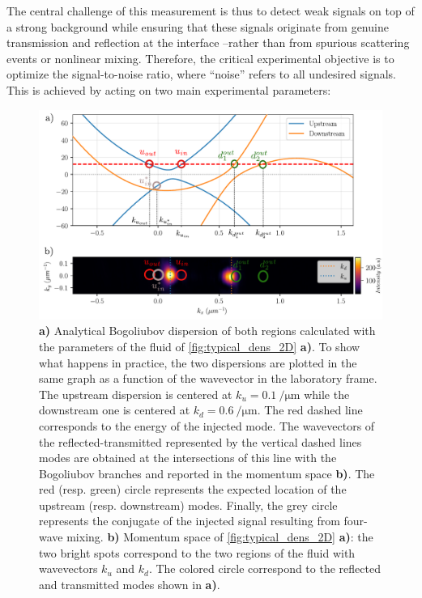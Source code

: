 The central challenge of this measurement is thus to detect weak signals on top of a strong background while ensuring that these signals originate from genuine transmission and reflection at the interface --rather than from spurious scattering events or nonlinear mixing. Therefore, the critical experimental objective is to optimize the signal-to-noise ratio, where “noise” refers to all undesired signals. This is achieved by acting on two main experimental parameters:


\begin{figure}
    \centering
    \includegraphics[width=1\textwidth]{chap_stimulated_hawking/fig/bh_k_space.pdf}
    \caption{\textbf{a)} Analytical Bogoliubov dispersion of both regions calculated with the parameters of the fluid of \autoref{fig:typical_dens_2D} \textbf{a)}. To show what happens in practice, the two dispersions are plotted in the same graph as a function of the wavevector in the laboratory frame. The upstream dispersion
    is centered at $k_u=\SI{0.1}{\per \micro \meter}$ while the downstream one is centered at $k_d=\SI{0.6}{\per \micro\meter}$. The red dashed line corresponds to the energy of the injected mode. The wavevectors of the reflected-transmitted represented by the vertical dashed lines modes are obtained 
    at the intersections of this line with the Bogoliubov branches and reported in the momentum space \textbf{b)}. The red (resp. green) circle represents the expected location 
    of the upstream (resp. downstream) modes. Finally, the grey circle represents the conjugate of the injected signal resulting from four-wave mixing. \textbf{b)} Momentum space of \autoref{fig:typical_dens_2D} \textbf{a)}: the two bright spots correspond to the two regions of the fluid with wavevectors $k_u$ and $k_d$. The colored circle
    correspond to the reflected and transmitted modes shown in \textbf{a)}.}
    \label{fig:bh_k_space}
\end{figure}

